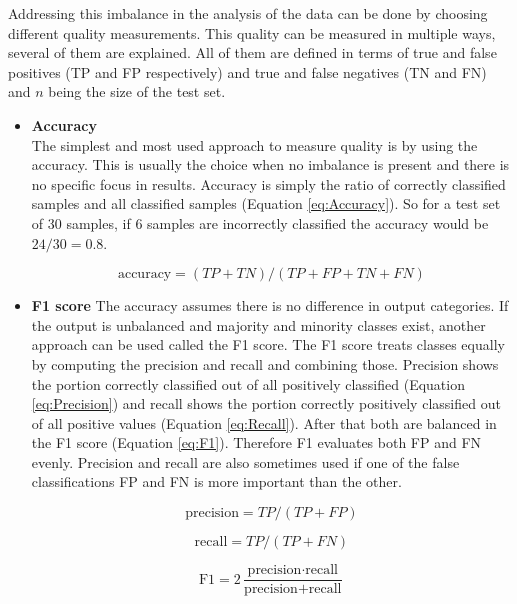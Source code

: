 \documentclass[10pt,a4paper]{article}
\begin{document}
	Addressing this imbalance in the analysis of the data can be done by choosing different quality measurements. This quality can be measured in multiple ways, several of them are explained. All of them are defined in terms of true and false positives (TP and FP respectively) and true and false negatives (TN and FN) and $n$ being the size of the test set.
	\begin{itemize}
		\item \textbf{Accuracy} \\
		The simplest and most used approach to measure quality is by using the accuracy. This is usually the choice when no imbalance is present and there is no specific focus in results. Accuracy is simply the ratio of correctly classified samples and all classified samples (Equation \ref{eq:Accuracy}). So for a test set of 30 samples, if 6 samples are incorrectly classified the accuracy would be $24/30 = 0.8$. 
		
		\begin{equation}\label{eq:Accuracy}
		\text{accuracy} = (TP + TN) / (TP + FP + TN + FN)
		\end{equation}
		
		\item \textbf{F1 score}
		The accuracy assumes there is no difference in output categories. If the output is unbalanced and majority and minority classes exist, another approach can be used called the F1 score. The F1 score treats classes equally by computing the precision and recall and combining those. Precision shows the portion correctly classified out of all positively classified (Equation \ref{eq:Precision}) and recall shows the portion correctly positively classified out of all positive values (Equation \ref{eq:Recall}). After that both are balanced in the F1 score (Equation \ref{eq:F1}). Therefore F1 evaluates both FP and FN evenly. Precision and recall are also sometimes used if one of the false classifications FP and FN is more important than the other.
		
		\begin{equation}\label{eq:Precision}
		\text{precision} = TP / (TP + FP)
		\end{equation}
		
		\begin{equation}\label{eq:Recall}
		\text{recall} = TP / (TP + FN)
		\end{equation}
		
		\begin{equation}\label{eq:F1}
		\text{F1} = 2 \frac{\text{precision} \cdot \text{recall}}{\text{precision} + \text{recall}}
		\end{equation}
		

\end{itemize}
\end{document}
